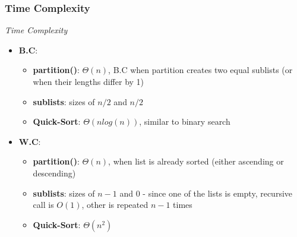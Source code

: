 \documentclass[10pt, 
a4paper, 
oneside, 
headinclude, footinclude, 
BCOR5mm]
{scrartcl}
\begin{document}
\subsubsection{Time Complexity}
\begin{definition}
    \textit{Time Complexity}
    \begin{itemize}
        \item \textbf{B.C}:
        \begin{itemize}
            \item \textbf{partition()}: $\Theta(n)$, B.C when partition creates two equal sublists (or when their lengths differ by 1)
            \item \textbf{sublists}: sizes of $n/2$ and $n/2$
            \item \textbf{Quick-Sort}: $\Theta(n log(n))$, similar to binary search
        \end{itemize} 
        \item \textbf{W.C}:
        \begin{itemize}
            \item \textbf{partition()}: $\Theta(n)$, when list is already sorted (either ascending or descending)
            \item \textbf{sublists}: sizes of $n-1$ and 0 - since one of the lists is empty, recursive call is $O(1)$, other is repeated $n-1$ times
            \item \textbf{Quick-Sort}: $\Theta(n^2)$
        \end{itemize}
    \end{itemize}
\end{definition}
\end{document}
